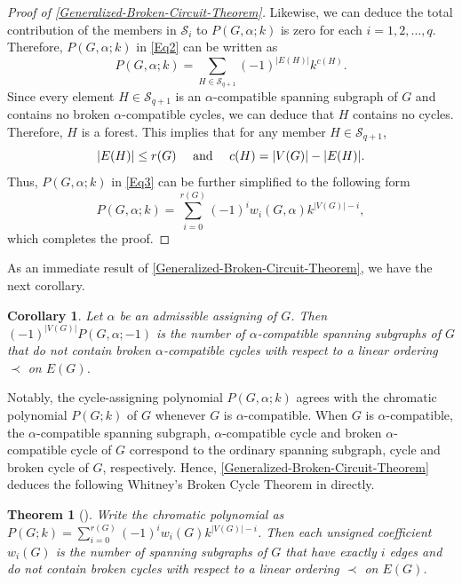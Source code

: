 \documentclass[12pt]{article}%
\numberwithin{equation}{section}
\def\And{\mbox{\rm ~and~}}
\newtheorem{theorem}{Theorem}[section]
\newtheorem{corollary}[corollary]{Corollary}
\begin{document}
\begin{proof}[Proof of \autoref{Generalized-Broken-Circuit-Theorem}]
Likewise, we can deduce the total contribution of the members in $\mathcal{S}_i$ to $P(G,\alpha;k)$ is zero for each $i=1,2,\ldots,q$. Therefore, $P(G,\alpha;k)$ in \eqref{Eq2} can be written as
\begin{equation}\label{Eq3}
P(G,\alpha;k)=\sum_{H\in\mathcal{S}_{q+1}}(-1)^{|E(H)|}k^{c(H)}.
\end{equation}
Since every element $H\in\mathcal{S}_{q+1}$ is an $\alpha$-compatible spanning subgraph of $G$ and contains no broken $\alpha$-compatible cycles, we can deduce that  $H$ contains no cycles. Therefore, $H$  is a forest. This implies that for any member $H\in\mathcal{S}_{q+1}$,
\[
|E(H)|\le r(G)\quad\And\quad c(H)=|V(G)|-|E(H)|.
\]
Thus, $P(G,\alpha;k)$ in \eqref{Eq3} can be further simplified to the following form
\[
P(G,\alpha;k)=\sum_{i=0}^{r(G)}(-1)^iw_i(G,\alpha)k^{|V(G)|-i},
\]
which completes the proof.
\end{proof}

As an immediate result of \autoref{Generalized-Broken-Circuit-Theorem}, we have the next corollary.
\begin{corollary}\label{Value-1}
Let $\alpha$ be an admissible assigning of $G$. Then $(-1)^{|V(G)|}P(G,\alpha;-1)$ is the number of $\alpha$-compatible spanning subgraphs of $G$ that do not contain  broken $\alpha$-compatible cycles with respect to a linear ordering $\prec$ on $E(G)$.
\end{corollary}

Notably, the cycle-assigning polynomial $P(G,\alpha;k)$ agrees with the chromatic polynomial $P(G;k)$ of $G$ whenever $G$ is $\alpha$-compatible. When $G$ is $\alpha$-compatible, the $\alpha$-compatible spanning subgraph, $\alpha$-compatible cycle and broken $\alpha$-compatible cycle of $G$ correspond to the ordinary spanning subgraph, cycle and broken cycle of $G$, respectively. Hence, \autoref{Generalized-Broken-Circuit-Theorem} deduces the following Whitney's Broken Cycle Theorem in \cite{Whitney1932} directly.
\begin{theorem}[\cite{Whitney1932}]\label{Broken-Cycle}
Write the chromatic polynomial as $P(G;k)=\sum_{i=0}^{r(G)}(-1)^iw_i(G)k^{|V(G)|-i}$. Then each unsigned coefficient $w_i(G)$ is the number of spanning subgraphs of $G$ that have exactly $i$ edges and do not contain broken cycles with respect to a linear ordering $\prec$ on $E(G)$.
\end{theorem}
\end{document}
